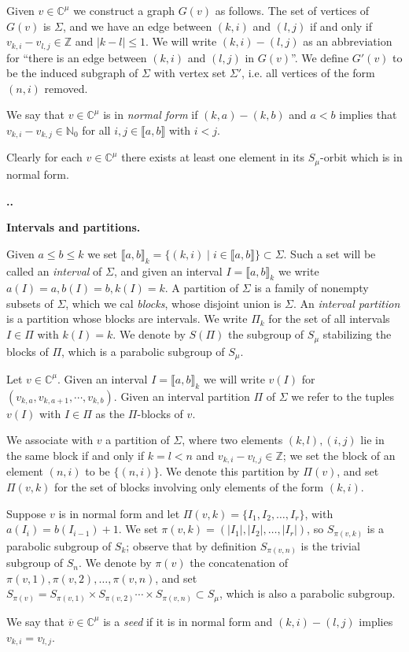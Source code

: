 \documentclass[11pt,fleqn]{amsart}
\renewcommand\thesection{\arabic{section}}
\newcounter{para}[section]
\renewcommand\thepara{\thesection.\arabic{para}}
\def\paragraph{%
 \noindent
 \refstepcounter{para}%
 \textbf{\thepara.}\hspace{1ex}%
}
\newcommand\about[1]{%
 {\bfseries#1.}%
}
\newcommand\NN{\mathbb N}
\newcommand\CC{\mathbb C}
\newcommand\ZZ{\mathbb Z}
\newcommand\vv{\overline{v}}
\newcommand\interval[1]{\llbracket #1 \rrbracket}
\newcommand\abs[1]{|#1|}
\begin{document}
Given $v \in \CC^\mu$ we construct a graph $G(v)$ as follows. The set of 
vertices of $G(v)$ is $\Sigma$, and we have an edge between $(k,i)$ and $(l,j)$
if and only if $v_{k,i} - v_{l,j} \in \ZZ$ and $\abs{k-l} \leq 1$. We will 
write $(k,i) - (l,j)$ as an abbreviation for ``there is an edge between $(k,i)$
and $(l,j)$ in $G(v)$''. We define $G'(v)$ to be the induced subgraph of 
$\Sigma$ with vertex set $\Sigma'$, i.e. all vertices of the form $(n,i)$ 
removed.
\begin{Definition}
We say that $v \in \CC^\mu$ is in \emph{normal form} if $(k,a) - (k,b)$
and $a < b$ implies that $v_{k,i} - v_{k,j} \in \NN_0$ for all $i,j \in 
\interval{a,b}$ with $i < j$. 
\end{Definition}
Clearly for each $v \in \CC^\mu$ there exists at least one element in its 
$S_\mu$-orbit which is in normal form. 

\paragraph
\label{intervals}
\about{Intervals and partitions}
Given $a \leq b \leq k$ we set $\interval{a,b}_k = \{(k,i) \mid i \in 
\interval{a,b}\} \subset \Sigma$. Such a set will be called an \emph{interval}
of $\Sigma$, and given an interval $I = \interval{a,b}_k$ we write $a(I) = a,
b(I) = b, k(I) = k$. A partition of $\Sigma$ is a family of nonempty subsets 
of $\Sigma$, which we cal \emph{blocks}, whose disjoint union is $\Sigma$.
An \emph{interval partition} is a partition whose blocks are intervals. We 
write $\Pi_k$ for the set of all intervals $I \in \Pi$ with $k(I) = k$. 
We denote by $S(\Pi)$ the subgroup of $S_\mu$ stabilizing the blocks of $\Pi$,
which is a parabolic subgroup of $S_\mu$.

Let $v \in \CC^\mu$. Given an interval $I = \interval{a,b}_k$ we will write 
$v(I)$ for $(v_{k,a}, v_{k,a+1}, \cdots, v_{k,b})$. Given an interval 
partition $\Pi$ of $\Sigma$ we refer to the tuples $v(I)$ with $I \in \Pi$
as the $\Pi$-blocks of $v$.

We associate with $v$ a partition of $\Sigma$, where two elements $(k,l),(i,j)$
lie in the same block if and only if $k = l < n$ and $v_{k,i} - v_{l,j} \in 
\ZZ$; we set the block of an element $(n,i)$ to be $\{(n,i)\}$. We denote this 
partition by $\Pi(v)$, and set $\Pi(v,k)$ for the set of blocks involving only 
elements of the form $(k,i)$. 

Suppose $v$ is in normal form and let $\Pi(v,k) = \{I_1, I_2, \ldots, I_r\}$, 
with $a(I_i) = b(I_{i-1}) + 1$. We set $\pi(v,k) = (\abs{I_1},\abs{I_2}, 
\ldots, \abs{I_r})$, so $S_{\pi(v,k)}$ is a parabolic subgroup of $S_k$; 
observe that by definition $S_{\pi(v,n)}$ is the trivial subgroup of $S_n$. 
We denote by $\pi(v)$ the concatenation of $\pi(v,1), \pi(v,2), \ldots,
\pi(v,n)$, and set $S_{\pi(v)} = S_{\pi(v,1)} \times S_{\pi(v,2)} \cdots 
\times S_{\pi(v,n)} \subset S_\mu$, which is also a parabolic subgroup.
\begin{Definition}
We say that $\vv \in \CC^\mu$ is a \emph{seed} if it is in normal form and 
$(k,i) - (l,j)$ implies $v_{k,i} = v_{l,j}$.
\end{Definition}
\end{document}
